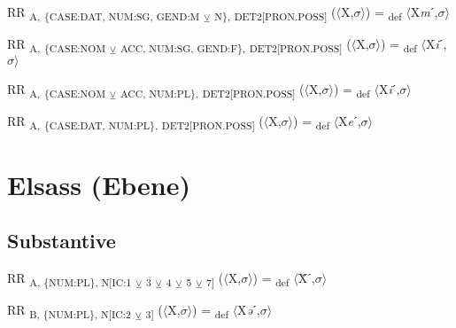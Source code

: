 {\begin{exe}
 RR \textsubscript{A,} \textsubscript{\{CASE:DAT, NUM:SG, GEND:M} \textsubscript{${\veebar}$}\textsubscript{ N\},} \textsubscript{DET2[PRON.POSS]} ($\langle$X,$\sigma $$\rangle$) = \textsubscript{def} $\langle$X\textit{m}ˊ,$\sigma $$\rangle$
\end{exe}

\begin{exe}
 RR \textsubscript{A,} \textsubscript{\{CASE:NOM} \textsubscript{${\veebar}$}\textsubscript{ ACC, NUM:SG, GEND:F\},} \textsubscript{DET2[PRON.POSS]} ($\langle$X,$\sigma $$\rangle$) = \textsubscript{def} $\langle$X\textit{i}ˊ,$\sigma $$\rangle$
\end{exe}

\begin{exe}
 RR \textsubscript{A,} \textsubscript{\{CASE:NOM} \textsubscript{${\veebar}$}\textsubscript{ ACC, NUM:PL\},} \textsubscript{DET2[PRON.POSS]} ($\langle$X,$\sigma $$\rangle$) = \textsubscript{def} $\langle$X\textit{i}ˊ,$\sigma $$\rangle$
\end{exe}

\begin{exe}
 RR \textsubscript{A,} \textsubscript{\{CASE:DAT, NUM:PL\},} \textsubscript{DET2[PRON.POSS]} ($\langle$X,$\sigma $$\rangle$) = \textsubscript{def} $\langle$X\textit{e}ˊ,$\sigma $$\rangle$
\end{exe}

\section{Elsass (Ebene)}

\subsection{Substantive}

\begin{exe}
 RR \textsubscript{A, \{NUM:PL\}, N[IC:1} \textsubscript{${\veebar}$}\textsubscript{ 3} \textsubscript{${\veebar}$}\textsubscript{ 4} \textsubscript{${\veebar}$}\textsubscript{ 5} \textsubscript{${\veebar}$}\textsubscript{ 7]} ($\langle$X,$\sigma $$\rangle$) = \textsubscript{def} $\langle$Ẍˊ,$\sigma $$\rangle$
\end{exe}

\begin{exe}
 RR \textsubscript{B, \{NUM:PL\}, N[IC:2} \textsubscript{${\veebar}$}\textsubscript{ 3]} ($\langle$X,$\sigma $$\rangle$) = \textsubscript{def} $\langle$X\textit{ə}ˊ,$\sigma $$\rangle$
\end{exe}

}
